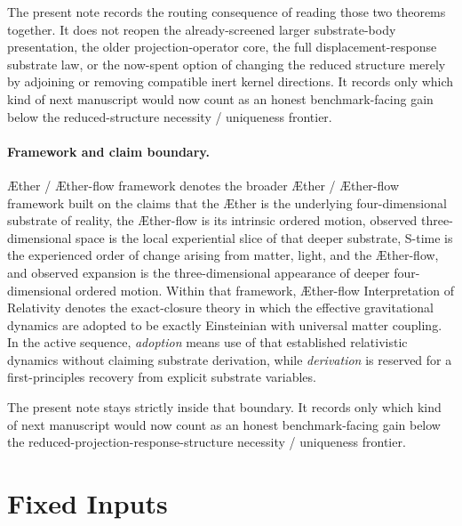 \documentclass[11pt]{article}
\newcommand{\Aether}{\AE{}ther}
\newcommand{\Aflow}{\AE{}ther-flow}
\newcommand{\TheoryName}{\Aflow{} Interpretation of Relativity}
\newcommand{\TheoryProgram}{\Aether{} / \Aflow{} framework}
\begin{document}
The present note records the routing consequence of reading those two theorems together. It does not reopen the already-screened larger substrate-body presentation, the older projection-operator core, the full displacement-response substrate law, or the now-spent option of changing the reduced structure merely by adjoining or removing compatible inert kernel directions. It records only which kind of next manuscript would now count as an honest benchmark-facing gain below the reduced-structure necessity / uniqueness frontier.

\paragraph{Framework and claim boundary.}
\TheoryProgram{} denotes the broader \Aether{} / \Aflow{} framework built on the claims that the \Aether{} is the underlying four-dimensional substrate of reality, the \Aflow{} is its intrinsic ordered motion, observed three-dimensional space is the local experiential slice of that deeper substrate, S-time is the experienced order of change arising from matter, light, and the \Aflow{}, and observed expansion is the three-dimensional appearance of deeper four-dimensional ordered motion. Within that framework, \TheoryName{} denotes the exact-closure theory in which the effective gravitational dynamics are adopted to be exactly Einsteinian with universal matter coupling. In the active sequence, \emph{adoption} means use of that established relativistic dynamics without claiming substrate derivation, while \emph{derivation} is reserved for a first-principles recovery from explicit substrate variables.

The present note stays strictly inside that boundary. It records only which kind of next manuscript would now count as an honest benchmark-facing gain below the reduced-projection-response-structure necessity / uniqueness frontier.

\section{Fixed Inputs}
\end{document}
